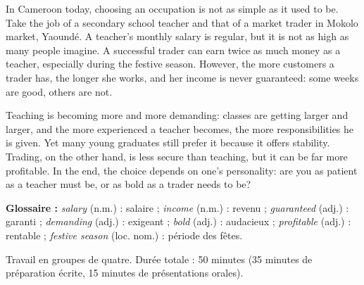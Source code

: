 \documentclass[11pt]{article}
\newcounter{popsec}
\newcounter{popsub}
\newcommand{\courssub}[1]{%
  \stepcounter{popsub}%
  \par\vspace{9pt}\noindent{\popxbold\fontsize{11.5}{13}\selectfont\color{popink}{\color{poporange}\thepopsec.\thepopsub}\hspace{6pt}#1}\par\nopagebreak\vspace{4pt}
}
\begin{document}
\begin{textebox}
In Cameroon today, choosing an occupation is not as simple as it used to be. Take the job of a secondary school teacher and that of a market trader in Mokolo market, Yaoundé. A teacher's monthly salary is regular, but it is not as high as many people imagine. A successful trader can earn twice as much money as a teacher, especially during the festive season. However, the more customers a trader has, the longer she works, and her income is never guaranteed: some weeks are good, others are not.

Teaching is becoming more and more demanding: classes are getting larger and larger, and the more experienced a teacher becomes, the more responsibilities he is given. Yet many young graduates still prefer it because it offers stability. Trading, on the other hand, is less secure than teaching, but it can be far more profitable. In the end, the choice depends on one's personality: are you as patient as a teacher must be, or as bold as a trader needs to be?
\end{textebox}

\textbf{Glossaire :} \emph{salary} (n.m.) : salaire ; \emph{income} (n.m.) : revenu ; \emph{guaranteed} (adj.) : garanti ; \emph{demanding} (adj.) : exigeant ; \emph{bold} (adj.) : audacieux ; \emph{profitable} (adj.) : rentable ; \emph{festive season} (loc. nom.) : période des fêtes.

\courssub{Consignes}

Travail en groupes de quatre. Durée totale : 50 minutes (35 minutes de préparation écrite, 15 minutes de présentations orales).
\end{document}
